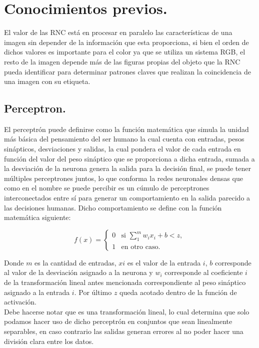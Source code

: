 \documentclass[a4paper, 12pt]{article}
\begin{document}
    \section{Conocimientos previos.} 
    El valor de las RNC está en procesar en paralelo las características de una imagen sin depender de la información que esta proporciona, si bien el orden de dichos valores es importante para el color ya que se utiliza un sistema RGB, el resto de la imagen depende más de las figuras propias del objeto que la RNC pueda identificar para determinar patrones claves que realizan la coincidencia de una imagen con su etiqueta. 

    \subsection{Perceptron.} 
    El perceptrón puede definirse como la función matemática que simula la unidad más básica del pensamiento del ser humano la cual cuenta con entradas, pesos sinápticos, desviaciones y salidas, la cual pondera el valor de cada entrada en función del valor del peso sináptico que se proporciona a dicha entrada, sumada a la desviación de la neurona genera la salida para la decisión final, se puede tener múltiples perceptrones juntos, lo que conforma la redes neuronales densas que como en el nombre se puede percibir es un cúmulo de perceptrones interconectados entre sí para generar un comportamiento en la salida parecido a las decisiones humanas. Dicho comportamiento se define con la función matemática siguiente: 

    \[ 
    f(x) = 
    \begin{cases} 
        0 & \text{si } \sum\limits_{1}^{m} w_i x_i + b < z, 
        \\ 
        1 & \text{en otro caso}. 
    \end{cases} 
    \]

    Donde $m$ es la cantidad de entradas, $xi$ es el valor de la entrada $i$, $b$ corresponde al valor de la desviación asignado a la neurona y $w_i$ corresponde al coeficiente $i$ de la transformación lineal antes mencionada correspondiente al peso sináptico asignado a la entrada $i$. Por último $z$ queda acotado dentro de la función de activación.\\ 
    Debe hacerse notar que es una transformación lineal, lo cual determina que solo podamos hacer uso de dicho perceptrón en conjuntos que sean linealmente separables, en caso contrario las salidas generan errores al no poder hacer una división clara entre los datos. 
\end{document}
